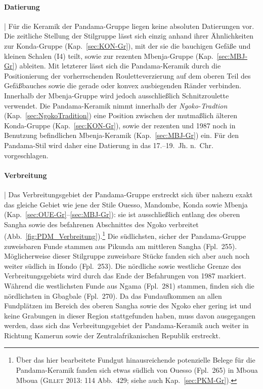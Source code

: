 \paragraph{Datierung}\hspace{-.5em}|\hspace{.5em}%
Für die Keramik der Pandama-Gruppe liegen keine absoluten Datierungen vor. Die zeitliche Stellung der Stilgruppe lässt sich einzig anhand ihrer Ähnlichkeiten zur Konda-Gruppe (Kap.~\ref{sec:KON-Gr}), mit der sie die bauchigen Gefäße und kleinen Schalen (I4) teilt, sowie zur rezenten Mbenja-Gruppe (Kap.~\ref{sec:MBJ-Gr}) ableiten. Mit letzterer lässt sich die Pandama-Keramik durch die Positionierung der vorherrschenden Rouletteverzierung auf dem oberen Teil des Gefäßbauches sowie die gerade oder konvex ausbiegenden Ränder verbinden. Innerhalb der Mbenja-Gruppe wird jedoch ausschließlich Schnitzroulette verwendet. Die Pandama-Keramik nimmt innerhalb der \textit{\mbox{Ngoko}-Tradtion} (Kap.~\ref{sec:NgokoTradition}) eine Position zwischen der mutmaßlich älteren Konda-Gruppe (Kap.~\ref{sec:KON-Gr}), sowie der rezenten und 1987 noch in Benutzung befindlichen Mbenja-Keramik (Kap.~\ref{sec:MBJ-Gr}) ein. Für den Pandama-Stil wird daher eine Datierung in das 17.--19.~Jh. n.~Chr. vorgeschlagen.


\paragraph{Verbreitung}\hspace{-.5em}|\hspace{.5em}%
Das Verbreitungsgebiet der Pandama-Gruppe erstreckt sich über nahezu exakt das gleiche Gebiet wie jene der Stile Ouesso, Mandombe, Konda sowie Mbenja (Kap.~\ref{sec:OUE-Gr}--\ref{sec:MBJ-Gr}): sie ist ausschließlich entlang des oberen \mbox{Sangha} sowie des befahrenen Abschnittes des \mbox{Ngoko} verbreitet (Abb.~\ref{fig:PDM_Verbreitung}).\footnote{Über das hier bearbeitete Fundgut hinausreichende potenzielle Belege für die Pandama-Keramik fanden sich etwas südlich von Ouesso (Fpl.~265) in Mboua Mboua (\textsc{Gillet} 2013: 114 Abb.~429; siehe auch Kap.~\ref{sec:PKM-Gr}).} Die südlichsten, sicher der Pandama-Gruppe zuweisbaren Funde stammen aus Pikunda am mittleren \mbox{Sangha} (Fpl.~255). Möglicherweise dieser Stilgruppe zuweisbare Stücke fanden sich aber auch noch weiter südlich in Ifondo (Fpl.~253). Die nördliche sowie westliche Grenze des Verbreitungsgebiets wird durch das Ende der Befahrungen von 1987 markiert. Während die westlichsten Funde aus Ngama (Fpl.~281) stammen, finden sich die nördlichsten in Gbagbale (Fpl.~270). Da das Fundaufkommen an allen Fundplätzen im Bereich des oberen \mbox{Sangha} sowie des \mbox{Ngoko} eher gering ist und keine Grabungen in dieser Region stattgefunden haben, muss davon ausgegangen werden, dass sich das Verbreitungsgebiet der Pandama-Keramik auch weiter in Richtung Kamerun sowie der Zentralafrikanischen Republik erstreckt.